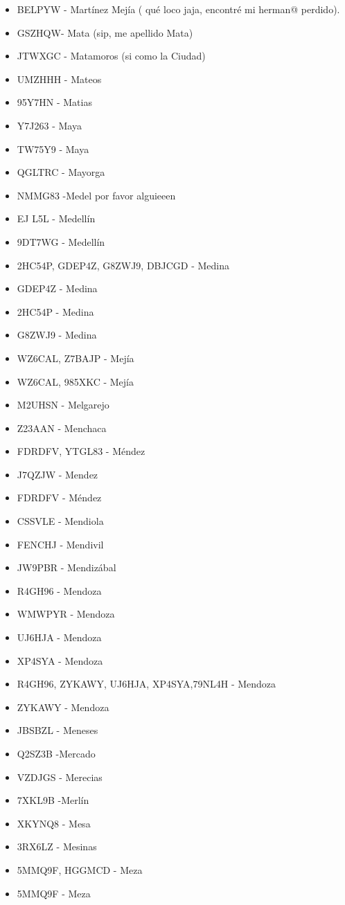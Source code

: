 \begin{itemize}[leftmargin=*,nosep]
\item BELPYW - Martínez Mejía ( qué loco jaja, encontré mi herman@ perdido).
\item GSZHQW- Mata (sip, me apellido Mata)
\item JTWXGC - Matamoros (si como la Ciudad)
\item UMZHHH - Mateos
\item 95Y7HN - Matias
\item Y7J263 - Maya
\item TW75Y9  -  Maya
\item QGLTRC - Mayorga
\item NMMG83 -Medel  por favor alguieeen
\item EJ L5L  -  Medellín
\item 9DT7WG  -  Medellín
\item 2HC54P, GDEP4Z, G8ZWJ9, DBJCGD - Medina
\item GDEP4Z - Medina
\item 2HC54P - Medina
\item G8ZWJ9 - Medina
\item WZ6CAL, Z7BAJP - Mejía
\item WZ6CAL, 985XKC - Mejía
\item M2UHSN - Melgarejo
\item Z23AAN - Menchaca
\item FDRDFV, YTGL83 - Méndez
\item J7QZJW - Mendez
\item FDRDFV - Méndez
\item CSSVLE - Mendiola
\item FENCHJ - Mendivil
\item JW9PBR - Mendizábal
\item R4GH96 - Mendoza
\item WMWPYR - Mendoza
\item UJ6HJA  -  Mendoza
\item XP4SYA - Mendoza
\item R4GH96, ZYKAWY, UJ6HJA, XP4SYA,79NL4H - Mendoza
\item ZYKAWY  -  Mendoza
\item JBSBZL - Meneses
\item Q2SZ3B -Mercado
\item VZDJGS - Merecias
\item 7XKL9B -Merlín
\item XKYNQ8 - Mesa
\item 3RX6LZ - Mesinas
\item 5MMQ9F, HGGMCD - Meza
\item 5MMQ9F  -  Meza

\end{itemize}
